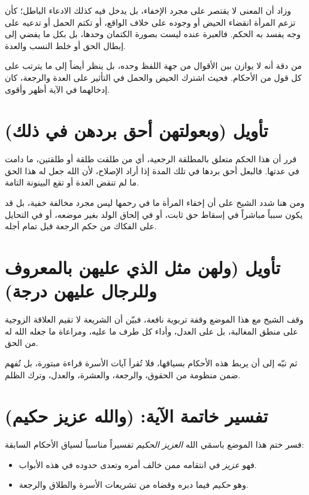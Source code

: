 وزاد أن المعنى لا يقتصر على مجرد الإخفاء، بل يدخل فيه كذلك الادعاء الباطل؛ كأن تزعم المرأة انقضاء الحيض أو وجوده على خلاف الواقع، أو تكتم الحمل أو تدعيه على وجه يفسد به الحكم. فالعبرة عنده ليست بصورة الكتمان وحدها، بل بكل ما يفضي إلى إبطال الحق أو خلط النسب والعدة.

\begin{fawaid}
من دقة  أنه لا يوازن بين الأقوال من جهة اللفظ وحده، بل ينظر أيضاً إلى ما يترتب على كل قول من الأحكام. فحيث اشترك الحيض والحمل في التأثير على العدة والرجعة، كان إدخالهما في الآية أظهر وأقوى.
\end{fawaid}

\section{تأويل (وبعولتهن أحق بردهن في ذلك)}
قرر  أن هذا الحكم متعلق بالمطلقة الرجعية، أي من طلقت طلقة أو طلقتين، ما دامت في عدتها. فالبعل أحق بردها في تلك المدة إذا أراد الإصلاح، لأن الله جعل له هذا الحق ما لم تنقض العدة أو تقع البينونة التامة.

ومن هنا شدد الشيخ على أن إخفاء المرأة ما في رحمها ليس مجرد مخالفة خفية، بل قد يكون سبباً مباشراً في إسقاط حق ثابت، أو في إلحاق الولد بغير موضعه، أو في التحايل على الفكاك من حكم الرجعة قبل تمام أجله.

\separator

\section{تأويل (ولهن مثل الذي عليهن بالمعروف وللرجال عليهن درجة)}
وقف الشيخ مع هذا الموضع وقفة تربوية نافعة، فبيّن أن الشريعة لا تقيم العلاقة الزوجية على منطق المغالبة، بل على العدل، وأداء كل طرف ما عليه، ومراعاة ما جعله الله له من الحق.

ثم نبّه إلى أن  يربط هذه الأحكام بسياقها، فلا تُقرأ آيات الأسرة قراءة مبتورة، بل تُفهم ضمن منظومة من الحقوق، والرجعة، والعشرة، والعدل، وترك الظلم.

\section{تفسير خاتمة الآية: (والله عزيز حكيم)}
فسر  ختم هذا الموضع باسمَي الله \textit{العزيز الحكيم} تفسيراً مناسباً لسياق الأحكام السابقة:
\begin{itemize}
    \item فهو \textit{عزيز} في انتقامه ممن خالف أمره وتعدى حدوده في هذه الأبواب.
    \item وهو \textit{حكيم} فيما دبره وقضاه من تشريعات الأسرة والطلاق والرجعة.
\end{itemize}

